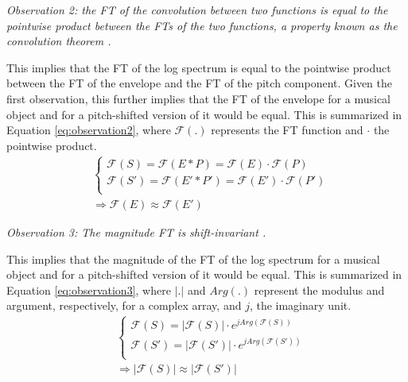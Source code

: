 \documentclass[journal]{IEEEtran}
\begin{document}
\emph{Observation 2: the FT of the convolution between two functions is equal to the pointwise product between the FTs of the two functions, a property known as the convolution theorem \cite{proakis1995}.}

This implies that the FT of the log spectrum is equal to the pointwise product between the FT of the envelope and the FT of the pitch component. Given the first observation, this further implies that the FT of the envelope for a musical object and for a pitch-shifted version of it would be equal. This is summarized in Equation \ref{eq:observation2}, where $\mathcal{F}(.)$ represents the FT function and $\cdot$ the pointwise product.
\begin{equation}
\label{eq:observation2}
\begin{split}
& \begin{cases}
\mathcal{F}(S) = \mathcal{F}(E * P) = \mathcal{F}(E) \cdot \mathcal{F}(P) \\
\mathcal{F}(S') = \mathcal{F}(E' * P') = \mathcal{F}(E') \cdot \mathcal{F}(P') \\
\end{cases} \\
& \Rightarrow \mathcal{F}(E) \approx \mathcal{F}(E')
\end{split}
\end{equation}

\emph{Observation 3: The magnitude FT is shift-invariant \cite{proakis1995}.}

This implies that the magnitude of the FT of the log spectrum for a musical object and for a pitch-shifted version of it would be equal. This is summarized in Equation \ref{eq:observation3}, where $|.|$ and $Arg(.)$ represent the modulus and argument, respectively, for a complex array, and $j$, the imaginary unit.
\begin{equation}
\label{eq:observation3}
\begin{split}
& \begin{cases}
\mathcal{F}(S) = |\mathcal{F}(S)| \cdot e^{j Arg(\mathcal{F}(S))} \\
\mathcal{F}(S') = |\mathcal{F}(S')| \cdot e^{j Arg(\mathcal{F}(S'))} \\
\end{cases} \\
& \Rightarrow |\mathcal{F}(S)| \approx |\mathcal{F}(S')|
\end{split}
\end{equation}
\end{document}
